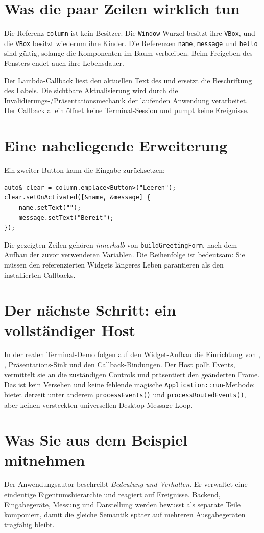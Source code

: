 \section{Was die paar Zeilen wirklich tun}
Die Referenz \texttt{column} ist kein Besitzer.
Die \texttt{Window}-Wurzel besitzt ihre \texttt{VBox},
und die \texttt{VBox} besitzt wiederum ihre Kinder.
Die Referenzen \texttt{name}, \texttt{message} und
\texttt{hello} sind gültig, solange die Komponenten im
Baum verbleiben. Beim Freigeben des Fensters endet auch
ihre Lebensdauer.

Der Lambda-Callback liest den aktuellen Text des
 und ersetzt die Beschriftung des Labels.
Die sichtbare Aktualisierung wird durch die
Invalidierungs-/Präsentationsmechanik der laufenden
Anwendung verarbeitet. Der Callback allein öffnet
keine Terminal-Session und pumpt keine Ereignisse.

\section{Eine naheliegende Erweiterung}
Ein zweiter Button kann die Eingabe zurücksetzen:
\begin{lstlisting}[language=SASDCpp]
auto& clear = column.emplace<Button>("Leeren");
clear.setOnActivated([&name, &message] {
    name.setText("");
    message.setText("Bereit");
});
\end{lstlisting}
Die gezeigten Zeilen gehören \emph{innerhalb} von
\texttt{buildGreetingForm}, nach dem Aufbau der zuvor
verwendeten Variablen. Die Reihenfolge ist bedeutsam:
Sie müssen den referenzierten Widgets längeres Leben
garantieren als den installierten Callbacks.

\section{Der nächste Schritt: ein vollständiger Host}
In der realen Terminal-Demo folgen auf den Widget-Aufbau
die Einrichtung von , ,
Präsentations-Sink und den Callback-Bindungen.
Der Host pollt Events, vermittelt sie an die
zuständigen Controls und präsentiert den geänderten
Frame. Das ist kein Versehen und keine fehlende
magische \texttt{Application::run}-Methode:
 bietet derzeit unter anderem
\texttt{processEvents()} und
\texttt{processRoutedEvents()}, aber keinen versteckten
universellen Desktop-Message-Loop.

\section{Was Sie aus dem Beispiel mitnehmen}
Der Anwendungsautor beschreibt \emph{Bedeutung und Verhalten}.
Er verwaltet eine eindeutige Eigentumshierarchie und
reagiert auf Ereignisse. Backend, Eingabegeräte, Messung
und Darstellung werden bewusst als separate Teile
komponiert, damit die gleiche Semantik später auf
mehreren Ausgabegeräten tragfähig bleibt.

